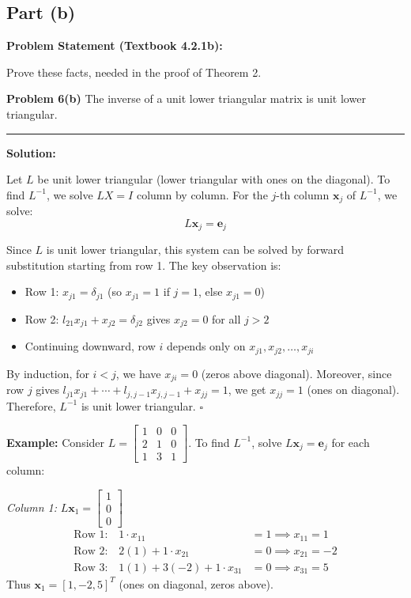\clearpage
\subsection*{Part (b)}

\textbf{Problem Statement (Textbook 4.2.1b):} 

Prove these facts, needed in the proof of Theorem 2.

\textbf{Problem 6(b)} The inverse of a unit lower triangular matrix is unit lower triangular.

\noindent\rule{\textwidth}{0.4pt}

\vspace{1em}

\textbf{Solution:}

Let $L$ be unit lower triangular (lower triangular with ones on the diagonal). To find $L^{-1}$, we solve $LX = I$ column by column. For the $j$-th column $\mathbf{x}_j$ of $L^{-1}$, we solve:
$$L\mathbf{x}_j = \mathbf{e}_j$$

Since $L$ is unit lower triangular, this system can be solved by forward substitution starting from row 1. The key observation is:
\begin{itemize}
    \item Row 1: $x_{j1} = \delta_{j1}$ (so $x_{j1} = 1$ if $j=1$, else $x_{j1} = 0$)
    \item Row 2: $l_{21}x_{j1} + x_{j2} = \delta_{j2}$ gives $x_{j2} = 0$ for all $j > 2$
    \item Continuing downward, row $i$ depends only on $x_{j1}, x_{j2}, \ldots, x_{ji}$
\end{itemize}

By induction, for $i < j$, we have $x_{ji} = 0$ (zeros above diagonal). Moreover, since row $j$ gives $l_{j1}x_{j1} + \cdots + l_{j,j-1}x_{j,j-1} + x_{jj} = 1$, we get $x_{jj} = 1$ (ones on diagonal). Therefore, $L^{-1}$ is unit lower triangular. $\square$

\vspace{1em}

\textbf{Example:} Consider $L = \begin{bmatrix} 1 & 0 & 0 \\ 2 & 1 & 0 \\ 1 & 3 & 1 \end{bmatrix}$. To find $L^{-1}$, solve $L\mathbf{x}_j = \mathbf{e}_j$ for each column:

\textit{Column 1:} $L\mathbf{x}_1 = \begin{bmatrix} 1 \\ 0 \\ 0 \end{bmatrix}$
\begin{align*}
\text{Row 1:} \quad 1 \cdot x_{11} &= 1 \implies x_{11} = 1 \\
\text{Row 2:} \quad 2(1) + 1 \cdot x_{21} &= 0 \implies x_{21} = -2 \\
\text{Row 3:} \quad 1(1) + 3(-2) + 1 \cdot x_{31} &= 0 \implies x_{31} = 5
\end{align*}
Thus $\mathbf{x}_1 = [1, -2, 5]^T$ (ones on diagonal, zeros above).

